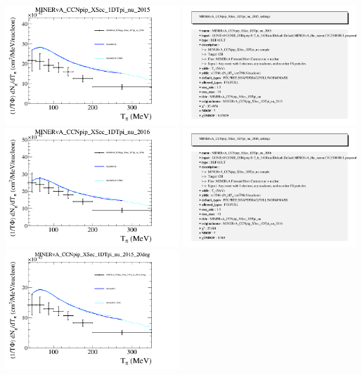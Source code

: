 \documentclass{article}
\begin{document}
\centering
\includegraphics[width=0.49\textwidth]{figures/nuisance_MINERvA_CCNpip_XSec_1DTpi_nu_2015_comp.png}
\includegraphics[width=0.49\textwidth]{figures/nuisance_MINERvA_CCNpip_XSec_1DTpi_nu_2015_info.png}
\centering
\includegraphics[width=0.49\textwidth]{figures/nuisance_MINERvA_CCNpip_XSec_1DTpi_nu_2016_comp.png}
\includegraphics[width=0.49\textwidth]{figures/nuisance_MINERvA_CCNpip_XSec_1DTpi_nu_2016_info.png}
\centering
\includegraphics[width=0.49\textwidth]{figures/nuisance_MINERvA_CCNpip_XSec_1DTpi_nu_2015_20deg_comp.png}
\end{document}
